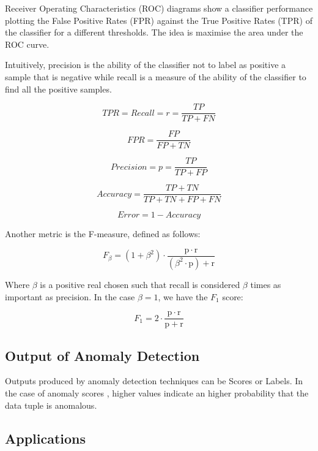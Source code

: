 Receiver Operating Characteristics (ROC) diagrams show a classifier performance plotting the False Positive Rates (FPR) against the True Positive Rates (TPR) of the classifier for a different thresholds. The idea is maximise the area under the ROC curve.

Intuitively, precision is the ability of the classifier not to label as positive a sample that is negative while recall is a measure of the ability of the classifier to find all the positive samples. \cite{scikit-learn}


\begin{equation}
	TPR = Recall = r = \frac{TP}{TP+FN}
\end{equation}

\begin{equation}
	FPR = \frac{FP}{FP+TN}
\end{equation}

\begin{equation}
	Precision = p = \frac{TP}{TP+FP}
\end{equation}

\begin{equation}
	Accuracy = \frac{TP+TN}{TP+TN+FP+FN}
\end{equation}

\begin{equation}
	Error = 1 - Accuracy
\end{equation}

Another metric is the F-measure, defined as follows:

\begin{equation}
	F_\beta = (1 + \beta^2) \cdot \frac{\mathrm{p} \cdot \mathrm{r}}{(\beta^2 \cdot \mathrm{p}) + \mathrm{r}}
\end{equation}

Where $\beta$ is a positive real chosen such that recall is considered $\beta$ times as important as precision. In the case $\beta = 1$, we have the $F_1$ score:

\begin{equation}
	F_1 = 2 \cdot \frac{\mathrm{p} \cdot \mathrm{r}}{\mathrm{p} + \mathrm{r}}
\end{equation}



\subsection{Output of Anomaly Detection}

Outputs produced by anomaly detection techniques can be Scores or Labels. In the case of anomaly scores \cite{chandola2009anomaly}, higher values indicate an higher probability that the data tuple is anomalous.


\subsection{Applications}


